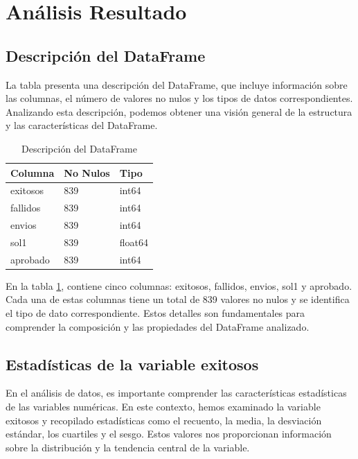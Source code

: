 \hypertarget{analisis_resultado}{%
    \section{Análisis Resultado}\label{Análisis Resultado}}

\subsection{Descripción del DataFrame}

La tabla presenta una descripción del DataFrame, que incluye información sobre las columnas,
el número de valores no nulos y los tipos de datos correspondientes.
Analizando esta descripción, podemos obtener una visión general de la estructura y las características
del DataFrame.

\begin{table}[htbp]
    \centering
    \caption{Descripción del DataFrame}
    \begin{tabular}{lll}
        \hline
        \textbf{Columna} & \textbf{No Nulos} & \textbf{Tipo} \\
        \hline
        exitosos         & 839               & int64         \\
        fallidos         & 839               & int64         \\
        envios           & 839               & int64         \\
        sol1             & 839               & float64       \\
        aprobado         & 839               & int64         \\
        \hline
    \end{tabular}%
    \label{tab:descripcion_dataframe}%
\end{table}%

En la tabla \ref{tab:descripcion_dataframe}, contiene cinco columnas: exitosos, fallidos, envios, sol1 y aprobado.
Cada una de estas columnas tiene un total de 839 valores no nulos y se identifica el tipo de dato
correspondiente. Estos detalles son fundamentales para comprender la composición y las propiedades del DataFrame analizado.

\subsection{Estadísticas de la variable exitosos}

En el análisis de datos, es importante comprender las características estadísticas de las variables numéricas.
En este contexto, hemos examinado la variable exitosos y recopilado estadísticas como el recuento, la media,
la desviación estándar, los cuartiles y el sesgo. Estos valores nos proporcionan información sobre la
distribución y la tendencia central de la variable.

